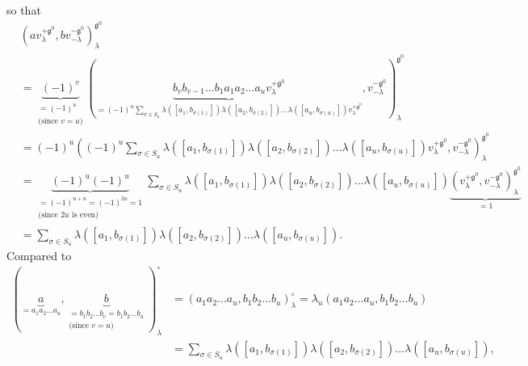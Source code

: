 \documentclass
[numbers=enddot,12pt,final,onecolumn,german,notitlepage]{scrartcl}%
\theoremstyle{definition}
\begin{document}
so that%
\begin{align*}
&  \left(  av_{\lambda}^{+\mathfrak{g}^{0}},bv_{-\lambda}^{-\mathfrak{g}^{0}%
}\right)  _{\lambda}^{\mathfrak{g}^{0}}\\
&  =\underbrace{\left(  -1\right)  ^{v}}_{\substack{=\left(  -1\right)
^{u}\\\text{(since }v=u\text{)}}}\left(  \underbrace{b_{v}b_{v-1}...b_{1}%
a_{1}a_{2}...a_{u}v_{\lambda}^{+\mathfrak{g}^{0}}}_{=\left(  -1\right)
^{u}\sum\limits_{\sigma\in S_{u}}\lambda\left(  \left[  a_{1},b_{\sigma\left(
1\right)  }\right]  \right)  \lambda\left(  \left[  a_{2},b_{\sigma\left(
2\right)  }\right]  \right)  ...\lambda\left(  \left[  a_{u},b_{\sigma\left(
u\right)  }\right]  \right)  v_{\lambda}^{+\mathfrak{g}^{0}}},v_{-\lambda
}^{-\mathfrak{g}^{0}}\right)  _{\lambda}^{\mathfrak{g}^{0}}\\
&  =\left(  -1\right)  ^{u}\left(  \left(  -1\right)  ^{u}\sum\limits_{\sigma
\in S_{u}}\lambda\left(  \left[  a_{1},b_{\sigma\left(  1\right)  }\right]
\right)  \lambda\left(  \left[  a_{2},b_{\sigma\left(  2\right)  }\right]
\right)  ...\lambda\left(  \left[  a_{u},b_{\sigma\left(  u\right)  }\right]
\right)  v_{\lambda}^{+\mathfrak{g}^{0}},v_{-\lambda}^{-\mathfrak{g}^{0}%
}\right)  _{\lambda}^{\mathfrak{g}^{0}}\\
&  =\underbrace{\left(  -1\right)  ^{u}\left(  -1\right)  ^{u}}%
_{\substack{=\left(  -1\right)  ^{u+u}=\left(  -1\right)  ^{2u}%
=1\\\text{(since }2u\text{ is even)}}}\sum\limits_{\sigma\in S_{u}}%
\lambda\left(  \left[  a_{1},b_{\sigma\left(  1\right)  }\right]  \right)
\lambda\left(  \left[  a_{2},b_{\sigma\left(  2\right)  }\right]  \right)
...\lambda\left(  \left[  a_{u},b_{\sigma\left(  u\right)  }\right]  \right)
\underbrace{\left(  v_{\lambda}^{+\mathfrak{g}^{0}},v_{-\lambda}%
^{-\mathfrak{g}^{0}}\right)  _{\lambda}^{\mathfrak{g}^{0}}}_{=1}\\
&  =\sum\limits_{\sigma\in S_{u}}\lambda\left(  \left[  a_{1},b_{\sigma\left(
1\right)  }\right]  \right)  \lambda\left(  \left[  a_{2},b_{\sigma\left(
2\right)  }\right]  \right)  ...\lambda\left(  \left[  a_{u},b_{\sigma\left(
u\right)  }\right]  \right)  .
\end{align*}
Compared to%
\begin{align*}
\left(  \underbrace{a}_{=a_{1}a_{2}...a_{u}},\underbrace{b}_{\substack{=b_{1}%
b_{2}...b_{v}=b_{1}b_{2}...b_{u}\\\text{(since }v=u\text{)}}}\right)
_{\lambda}^{\circ}  &  =\left(  a_{1}a_{2}...a_{u},b_{1}b_{2}...b_{u}\right)
_{\lambda}^{\circ}=\lambda_{u}\left(  a_{1}a_{2}...a_{u},b_{1}b_{2}%
...b_{u}\right) \\
&  =\sum\limits_{\sigma\in S_{u}}\lambda\left(  \left[  a_{1},b_{\sigma\left(
1\right)  }\right]  \right)  \lambda\left(  \left[  a_{2},b_{\sigma\left(
2\right)  }\right]  \right)  ...\lambda\left(  \left[  a_{u},b_{\sigma\left(
u\right)  }\right]  \right)  ,
\end{align*}
\end{document}
